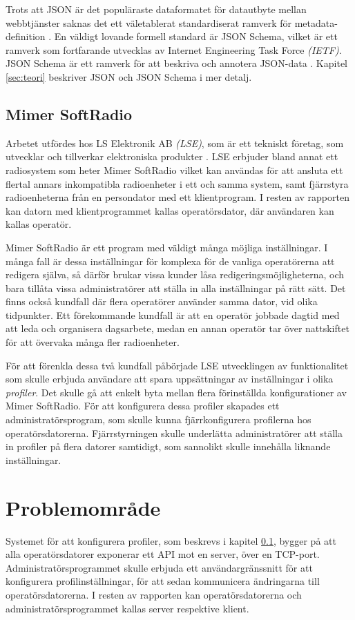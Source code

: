 Trots att JSON är det populäraste dataformatet för datautbyte mellan webbtjänster saknas det ett väletablerat standardiserat ramverk för metadata-definition \cite{Pezoa2016}. En väldigt lovande formell standard är JSON Schema, vilket är ett ramverk som fortfarande utvecklas av Internet Engineering Task Force \textit{(IETF)}. JSON Schema är ett ramverk för att beskriva och annotera JSON-data \cite{A.Wright}. Kapitel \ref{sec:teori} beskriver JSON och JSON Schema i mer detalj.

\subsection{Mimer SoftRadio}
\label{sec:intro:mimer}
Arbetet utfördes hos LS Elektronik AB \textit{(LSE)}, som är ett tekniskt företag, som utvecklar och tillverkar elektroniska produkter \cite{Ehne}. LSE erbjuder bland annat ett radiosystem som heter Mimer SoftRadio vilket kan användas för att ansluta ett flertal annars inkompatibla radioenheter i ett och samma system, samt fjärrstyra radioenheterna från en persondator med ett klientprogram. I resten av rapporten kan datorn med klientprogrammet kallas operatörsdator, där användaren kan kallas operatör.

Mimer SoftRadio är ett program med väldigt många möjliga inställningar. I många fall är dessa inställningar för komplexa för de vanliga operatörerna att redigera själva, så därför brukar vissa kunder låsa redigeringsmöjligheterna, och bara tillåta vissa administratörer att ställa in alla inställningar på rätt sätt. Det finns också kundfall där flera operatörer använder samma dator, vid olika tidpunkter. Ett förekommande kundfall är att en operatör jobbade dagtid med att leda och organisera dagsarbete, medan en annan operatör tar över nattskiftet för att övervaka många fler radioenheter.

För att förenkla dessa två kundfall påbörjade LSE utvecklingen av funktionalitet som skulle erbjuda användare att spara uppsättningar av inställningar i olika \textit{profiler}. Det skulle gå att enkelt byta mellan flera förinställda konfigurationer av Mimer SoftRadio. För att konfigurera dessa profiler skapades ett administratörsprogram, som skulle kunna fjärrkonfigurera profilerna hos operatörsdatorerna. Fjärrstyrningen skulle underlätta administratörer att ställa in profiler på flera datorer samtidigt, som sannolikt skulle innehålla liknande inställningar.

\section{Problemområde}
\label{sec:intro:problemområde}
Systemet för att konfigurera profiler, som beskrevs i kapitel \ref{sec:intro:mimer}, bygger på att alla operatörsdatorer exponerar ett API mot en server, över en TCP-port. Administratörsprogrammet skulle erbjuda ett användargränssnitt för att konfigurera profilinställningar, för att sedan kommunicera ändringarna till operatörsdatorerna. I resten av rapporten kan operatörsdatorerna och administratörsprogrammet kallas server respektive klient.

